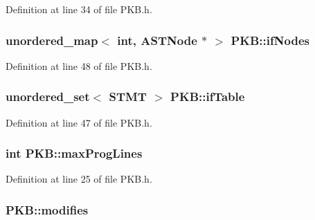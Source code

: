 Definition at line 34 of file P\-K\-B.\-h.

\hypertarget{class_p_k_b_abc04a09157ed8733ea6ce207af0a837d}{
\subsubsection[{if\-Nodes}]{\setlength{\rightskip}{0pt plus 5cm}unordered\-\_\-map$<$ int, {\bf A\-S\-T\-Node} $\ast$ $>$ P\-K\-B\-::if\-Nodes\hspace{0.3cm}{\ttfamily [static]}}}\label{class_p_k_b_abc04a09157ed8733ea6ce207af0a837d}


Definition at line 48 of file P\-K\-B.\-h.

\hypertarget{class_p_k_b_a151454c4bd06a6a0df1905cb21634f13}{
\subsubsection[{if\-Table}]{\setlength{\rightskip}{0pt plus 5cm}unordered\-\_\-set$<$ {\bf S\-T\-M\-T} $>$ P\-K\-B\-::if\-Table\hspace{0.3cm}{\ttfamily [static]}}}\label{class_p_k_b_a151454c4bd06a6a0df1905cb21634f13}


Definition at line 47 of file P\-K\-B.\-h.

\hypertarget{class_p_k_b_ae3b310bfb545d59911cd4f6bb54ebd94}{
\subsubsection[{max\-Prog\-Lines}]{\setlength{\rightskip}{0pt plus 5cm}int P\-K\-B\-::max\-Prog\-Lines\hspace{0.3cm}{\ttfamily [static]}}}\label{class_p_k_b_ae3b310bfb545d59911cd4f6bb54ebd94}


Definition at line 25 of file P\-K\-B.\-h.

\hypertarget{class_p_k_b_acdeea65712ec5e26401bf04ca41fa526}{
\subsubsection[{modifies}]{ P\-K\-B\-::modifies\hspace{0.3cm}{\ttfamily [static]}}}\label{class_p_k_b_acdeea65712ec5e26401bf04ca41fa526}


